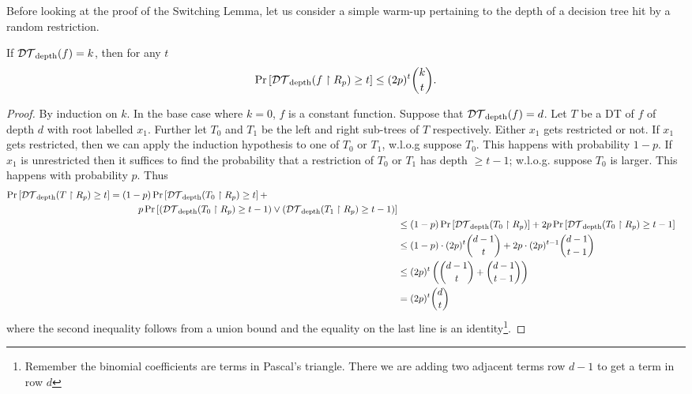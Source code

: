 \documentclass[11pt]{article}
\begin{document}
	Before looking at the proof of the Switching Lemma, let us consider a simple warm-up pertaining to the depth of a decision tree hit by a random restriction. 
	\begin{theorem}
		If $\mathcal{DT}_{\mathrm{depth}}(f) = k$, then for any $t$
		\[\Pr\left[\mathcal{DT}_{\mathrm{depth}}(f \upharpoonright R_p) \geq t\right] \leq (2p)^t \binom{k}{t}.\]
	\end{theorem}
	\begin{proof}
		By induction on $k$. In the base case where $k = 0$, $f$ is a constant function. Suppose that $\mathcal{DT}_{\mathrm{depth}}(f) = d$. Let $T$ be a DT of $f$ of depth $d$ with root labelled $x_1$. Further let $T_0$ and $T_1$ be the left and right sub-trees of $T$ respectively. Either $x_1$ gets restricted or not. If $x_1$ gets restricted, then we can apply the induction hypothesis to one of $T_0$ or $T_1$, w.l.o.g suppose $T_0$. This happens with probability $1 - p$. If $x_1$ is unrestricted then it suffices to find the probability that a restriction of $T_0$ or $T_1$ has depth $\geq t-1$; w.l.o.g. suppose $T_0$ is larger. This happens with probability $p$. Thus 
		\begin{align*}
			\begin{split}
				\Pr\left[\mathcal{DT}_{\mathrm{depth}}(T \upharpoonright R_p) \geq t\right] &= (1-p)\Pr\left[\mathcal{DT}_{\mathrm{depth}}(T_0 \upharpoonright R_p) \geq t\right]+\\ & \qquad\quad p\Pr\left[\left(\mathcal{DT}_{\mathrm{depth}}(T_0 \upharpoonright R_p) \geq t-1\right) \lor \left(\mathcal{DT}_{\mathrm{depth}}(T_1 \upharpoonright R_p) \geq t-1\right)\right]
			\end{split}
			\\
			&\leq (1-p)\Pr\left[\mathcal{DT}_{\mathrm{depth}}(T_0 \upharpoonright R_p)\right] + 2p\Pr\left[\mathcal{DT}_{\mathrm{depth}}(T_0 \upharpoonright R_p) \geq t-1\right]\\
			&\leq (1-p)\cdot(2p)^{t}\binom{d-1}{t} + 2p\cdot(2p)^{t-1}\binom{d-1}{t-1}\\
			&\leq (2p)^{t}\left(\binom{d-1}{t} + \binom{d-1}{t-1}\right)\\
			&= (2p)^{t}\binom{d}{t}
		\end{align*}
		where the second inequality follows from a union bound and the equality on the last line is an identity\footnote{Remember the binomial coefficients are terms in Pascal's triangle. There we are adding two adjacent terms row $d-1$ to get a term in row $d$}.
	\end{proof}
	
\end{document}
